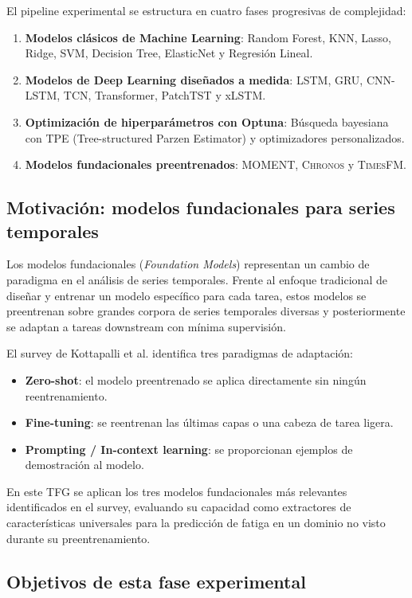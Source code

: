 \documentclass[12pt, a4paper]{article}
\newcommand{\moment}{\textsc{MOMENT}}
\newcommand{\chronos}{\textsc{Chronos}}
\newcommand{\timesfm}{\textsc{TimesFM}}
\begin{document}
El pipeline experimental se estructura en cuatro fases progresivas de complejidad:
\begin{enumerate}[label=\arabic*.]
    \item \textbf{Modelos clásicos de Machine Learning}: Random Forest, KNN, Lasso, Ridge, SVM, Decision Tree, ElasticNet y Regresión Lineal.
    \item \textbf{Modelos de Deep Learning diseñados a medida}: LSTM, GRU, CNN-LSTM, TCN, Transformer, PatchTST y xLSTM.
    \item \textbf{Optimización de hiperparámetros con Optuna}: Búsqueda bayesiana con TPE (Tree-structured Parzen Estimator) y optimizadores personalizados.
    \item \textbf{Modelos fundacionales preentrenados}: \moment{}, \chronos{} y \timesfm{}.
\end{enumerate}

\subsection{Motivación: modelos fundacionales para series temporales}

Los modelos fundacionales (\textit{Foundation Models}) representan un cambio de paradigma en el análisis de series temporales. Frente al enfoque tradicional de diseñar y entrenar un modelo específico para cada tarea, estos modelos se preentrenan sobre grandes corpora de series temporales diversas y posteriormente se adaptan a tareas downstream con mínima supervisión.

El survey de Kottapalli et al. \cite{kottapalli2025survey} identifica tres paradigmas de adaptación:
\begin{itemize}
    \item \textbf{Zero-shot}: el modelo preentrenado se aplica directamente sin ningún reentrenamiento.
    \item \textbf{Fine-tuning}: se reentrenan las últimas capas o una cabeza de tarea ligera.
    \item \textbf{Prompting / In-context learning}: se proporcionan ejemplos de demostración al modelo.
\end{itemize}

En este TFG se aplican los tres modelos fundacionales más relevantes identificados en el survey, evaluando su capacidad como extractores de características universales para la predicción de fatiga en un dominio no visto durante su preentrenamiento.

\subsection{Objetivos de esta fase experimental}
\end{document}
